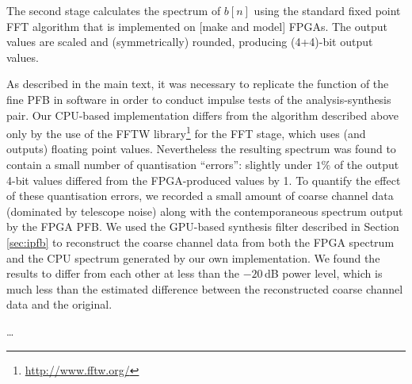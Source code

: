 \documentclass{pasa}%
\begin{document}
\begin{appendix}
\begin{figure}[t!]
    \label{fig:pre_fft_distributions}
\end{figure}

The second stage calculates the spectrum of $b[n]$ using the standard fixed point FFT algorithm that is implemented on [make and model] FPGAs.
The output values are scaled and (symmetrically) rounded, producing (4+4)-bit output values.

As described in the main text, it was necessary to replicate the function of the fine PFB in software in order to conduct impulse tests of the analysis-synthesis pair.
Our CPU-based implementation differs from the algorithm described above only by the use of the FFTW library\footnote{\url{http://www.fftw.org/}} for the FFT stage, which uses (and outputs) floating point values.
Nevertheless the resulting spectrum was found to contain a small number of quantisation ``errors'': slightly under $1\%$ of the output 4-bit values differed from the FPGA-produced values by 1.
To quantify the effect of these quantisation errors, we recorded a small amount of coarse channel data (dominated by telescope noise) along with the contemporaneous spectrum output by the FPGA PFB.
We used the GPU-based synthesis filter described in Section \ref{sec:ipfb} to reconstruct the coarse channel data from both the FPGA spectrum and the CPU spectrum generated by our own implementation.
We found the results to differ from each other at less than the $-20\,$dB power level, which is much less than the estimated difference between the reconstructed coarse channel data and the original.

\dots

\end{appendix}



\end{document}
